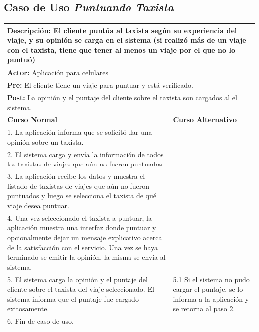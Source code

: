 \documentclass[a4paper]{article}
\begin{document}
\subsection{Caso de Uso \textit{Puntuando Taxista}}
\begin{center}
\begin{tabular}{|p{10cm} | p{6cm}|}
\hline
\multicolumn{2}{|p{16cm}|}{\textbf{Descripci\'on:} El cliente punt\'ua al taxista seg\'un su experiencia del viaje, y su opini\'on se carga en el sistema (si realiz\'o m\'as de un viaje con el taxista, tiene que tener al menos un viaje por el que no lo puntu\'o)} \\
\hline
\multicolumn{2}{|l|}{\textbf{Actor:} Aplicaci\'on para celulares } \\
\hline
\multicolumn{2}{|p{15.5cm}|}{\textbf{Pre:} El cliente tiene un viaje para puntuar y est\'a verificado.} \\
\hline
\multicolumn{2}{|p{14cm}|}{\textbf{Post:} La opini\'on y el puntaje del cliente sobre el taxista son cargados al el sistema. }\\
\hline
\textbf{Curso Normal}  & \textbf{Curso Alternativo} \\ \hline
1. La aplicaci\'on informa que se solicit\'o dar una opini\'on sobre un taxista. & \\ \hline
2. El sistema carga y env\'ia la informaci\'on de todos los taxistas de viajes que a\'un no fueron puntuados. & \\ \hline
3. La aplicaci\'on recibe los datos y muestra el listado de taxistas de viajes que a\'un no fueron puntuados y luego se selecciona el taxista de qu\'e viaje desea puntuar.  & \\ \hline
4. Una vez seleccionado el taxista a puntuar, la aplicaci\'on muestra una interfaz donde puntuar y opcionalmente dejar un mensaje explicativo acerca de la satisfacci\'on con el servicio. Una vez se haya terminado se emitir la opini\'on, la misma se env\'ia al sistema. & \\ \hline
5. El sistema carga la opini\'on y el puntaje del cliente sobre el taxista del viaje seleccionado. El sistema informa que el puntaje fue cargado exitosamente. & 5.1 Si el sistema no pudo cargar el puntaje, se lo informa a la aplicaci\'on y se retorna al paso 2.\\ \hline
6. Fin de caso de uso. & \\ \hline


\end{tabular}
\end{center}
\end{document}
